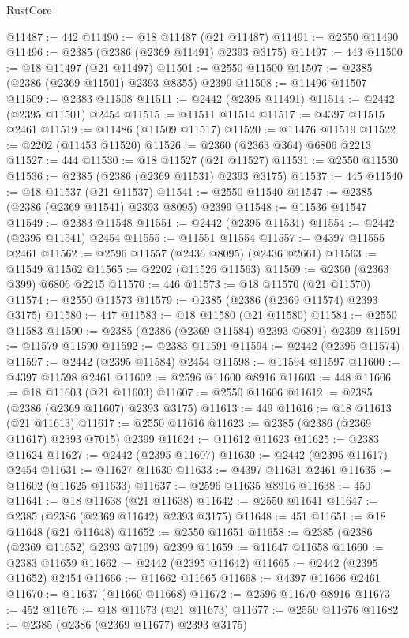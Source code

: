 \begin{lexlean}{RustCore}
\begin{coremodule}
@11487 := 442
@11490 := @18 @11487 (@21 @11487)
@11491 := @2550 @11490
@11496 := @2385 (@2386 (@2369 @11491) @2393 @3175)
@11497 := 443
@11500 := @18 @11497 (@21 @11497)
@11501 := @2550 @11500
@11507 := @2385 (@2386 (@2369 @11501) @2393 @8355) @2399
@11508 := @11496 @11507
@11509 := @2383 @11508
@11511 := @2442 (@2395 @11491)
@11514 := @2442 (@2395 @11501) @2454
@11515 := @11511 @11514
@11517 := @4397 @11515 @2461
@11519 := @11486 (@11509 @11517)
@11520 := @11476 @11519
@11522 := @2202 (@11453 @11520)
@11526 := @2360 (@2363 @364) @6806 @2213
@11527 := 444
@11530 := @18 @11527 (@21 @11527)
@11531 := @2550 @11530
@11536 := @2385 (@2386 (@2369 @11531) @2393 @3175)
@11537 := 445
@11540 := @18 @11537 (@21 @11537)
@11541 := @2550 @11540
@11547 := @2385 (@2386 (@2369 @11541) @2393 @8095) @2399
@11548 := @11536 @11547
@11549 := @2383 @11548
@11551 := @2442 (@2395 @11531)
@11554 := @2442 (@2395 @11541) @2454
@11555 := @11551 @11554
@11557 := @4397 @11555 @2461
@11562 := @2596 @11557 (@2436 @8095) (@2436 @2661)
@11563 := @11549 @11562
@11565 := @2202 (@11526 @11563)
@11569 := @2360 (@2363 @399) @6806 @2215
@11570 := 446
@11573 := @18 @11570 (@21 @11570)
@11574 := @2550 @11573
@11579 := @2385 (@2386 (@2369 @11574) @2393 @3175)
@11580 := 447
@11583 := @18 @11580 (@21 @11580)
@11584 := @2550 @11583
@11590 := @2385 (@2386 (@2369 @11584) @2393 @6891) @2399
@11591 := @11579 @11590
@11592 := @2383 @11591
@11594 := @2442 (@2395 @11574)
@11597 := @2442 (@2395 @11584) @2454
@11598 := @11594 @11597
@11600 := @4397 @11598 @2461
@11602 := @2596 @11600 @8916
@11603 := 448
@11606 := @18 @11603 (@21 @11603)
@11607 := @2550 @11606
@11612 := @2385 (@2386 (@2369 @11607) @2393 @3175)
@11613 := 449
@11616 := @18 @11613 (@21 @11613)
@11617 := @2550 @11616
@11623 := @2385 (@2386 (@2369 @11617) @2393 @7015) @2399
@11624 := @11612 @11623
@11625 := @2383 @11624
@11627 := @2442 (@2395 @11607)
@11630 := @2442 (@2395 @11617) @2454
@11631 := @11627 @11630
@11633 := @4397 @11631 @2461
@11635 := @11602 (@11625 @11633)
@11637 := @2596 @11635 @8916
@11638 := 450
@11641 := @18 @11638 (@21 @11638)
@11642 := @2550 @11641
@11647 := @2385 (@2386 (@2369 @11642) @2393 @3175)
@11648 := 451
@11651 := @18 @11648 (@21 @11648)
@11652 := @2550 @11651
@11658 := @2385 (@2386 (@2369 @11652) @2393 @7109) @2399
@11659 := @11647 @11658
@11660 := @2383 @11659
@11662 := @2442 (@2395 @11642)
@11665 := @2442 (@2395 @11652) @2454
@11666 := @11662 @11665
@11668 := @4397 @11666 @2461
@11670 := @11637 (@11660 @11668)
@11672 := @2596 @11670 @8916
@11673 := 452
@11676 := @18 @11673 (@21 @11673)
@11677 := @2550 @11676
@11682 := @2385 (@2386 (@2369 @11677) @2393 @3175)

\end{coremodule}
\end{lexlean}
